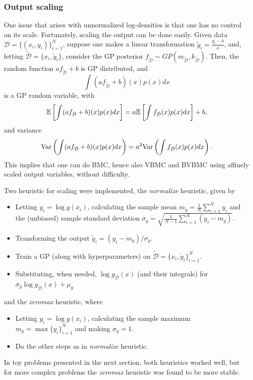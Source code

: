 \subsubsection{Output scaling}\label{outputscaling}
One issue that arises with unnormalized log-densities is that one has no control on its scale. Fortunately, scaling the output can be done easily. Given data $\mathcal{D} = \{(x_i,y_i)\}_{i=1}^N$, suppose one makes a linear transformation $\tilde{y}_i = \frac{y_i-b}{a}$, and, letting $\tilde{\mathcal{D}} = \{x_i,\tilde{y}_i\}$, consider the GP posterior $f_{\tilde{\mathcal{D}}} \sim GP(m_{\tilde{\mathcal{D}}},k_{\tilde{\mathcal{D}}})$. Then, the random function $a f_{\tilde{\mathcal{D}}} + b$ is GP distributed, and
\begin{equation}
\int (a f_{\tilde{\mathcal{D}}} + b)(x) p(x) dx 
\end{equation}
is a GP random variable, with
\begin{equation}
{\mathbb E} \left[\int (a f_{\tilde{\mathcal{D}}} + b)(x) p(x) dx \right] = a {\mathbb E} \left[ \int f_{\tilde{\mathcal{D}}}(x) p(x) dx \right] + b,
\end{equation}
and variance 
\begin{equation}
\mathrm{Var} \left(\int (a f_{\tilde{\mathcal{D}}} + b)(x) p(x) dx \right) = a^2 \mathrm{Var} \left( \int f_{\tilde{\mathcal{D}}}(x) p(x) dx \right).
\end{equation}
This implies that one can do BMC, hence also VBMC and BVBMC using affinely scaled output variables, without difficulty.

Two heuristic for scaling were implemented, the \textit{normalize} heuristic, given by
\begin{itemize}
	\item Letting $y_i = \log g(x_i)$, calculating the sample mean $m_y = \frac{1}{N} \sum_{i=1}^N y_i$ and the (unbiased) sample standard deviation $\sigma_y = \sqrt{\frac{1}{N-1} \sum_{i=1}^N (y_i-m_y)}$.
	\item Transforming the output $\tilde{y}_i = (y_i-m_y)/\sigma_y$.
	\item Train a GP (along with hyperparameters) on $\tilde{\mathcal{D}} = \{x_i,\tilde{y}_i\}_{i=1}^N$.
	\item Substituting, when needed, $\log g_\mathcal{D}(x)$ (and their integrals) for $\sigma_y \log g_\mathcal{\tilde{D}}(x) + \mu_y$
\end{itemize}
and the \textit{zeromax} heuristic, where
\begin{itemize}
	\item Letting $y_i = \log g(x_i)$, calculating the sample maximum $m_y = \max\{y_i\}_{i=1}^N$ and making $\sigma_y = 1$.
	\item Do the other steps as in \textit{normalize} heuristic.
\end{itemize}
In toy problems presented in the next section, both heuristics worked well, but for more complex problems the \textit{zeromax} heuristic was found to be more stable.

